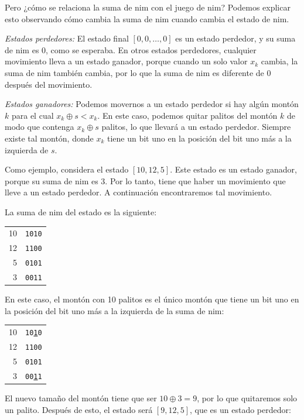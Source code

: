 Pero ¿cómo se relaciona la suma de nim con el juego de nim?
Podemos explicar esto observando cómo cambia la suma de nim
cuando cambia el estado de nim.

\textit{Estados perdedores:}
El estado final $[0,0,\ldots,0]$ es un estado perdedor,
y su suma de nim es 0, como se esperaba.
En otros estados perdedores, cualquier movimiento lleva a
un estado ganador, porque cuando un solo valor $x_k$ cambia,
la suma de nim también cambia, por lo que la suma de nim
es diferente de 0 después del movimiento.

\textit{Estados ganadores:}
Podemos movernos a un estado perdedor si
hay algún montón $k$ para el cual $x_k \oplus s < x_k$.
En este caso, podemos quitar palitos del
montón $k$ de modo que contenga $x_k \oplus s$ palitos,
lo que llevará a un estado perdedor.
Siempre existe tal montón, donde $x_k$
tiene un bit uno en la posición del bit uno
más a la izquierda de $s$.

Como ejemplo, considera el estado $[10,12,5]$.
Este estado es un estado ganador,
porque su suma de nim es 3.
Por lo tanto, tiene que haber un movimiento que
lleve a un estado perdedor.
A continuación encontraremos tal movimiento.

La suma de nim del estado es la siguiente:

\begin{center}
\begin{tabular}{r|r}
10 & \texttt{1010} \\
12 & \texttt{1100} \\
5 & \texttt{0101} \\
\hline
3 & \texttt{0011} \\
\end{tabular}
\end{center}

En este caso, el montón con 10 palitos
es el único montón que tiene un bit uno
en la posición del bit uno
más a la izquierda de la suma de nim:

\begin{center}
\begin{tabular}{r|r}
10 & \texttt{10\underline{1}0} \\
12 & \texttt{1100} \\
5 & \texttt{0101} \\
\hline
3 & \texttt{00\underline{1}1} \\
\end{tabular}
\end{center}

El nuevo tamaño del montón tiene que ser
$10 \oplus 3 = 9$,
por lo que quitaremos solo un palito.
Después de esto, el estado será $[9,12,5]$,
que es un estado perdedor:

